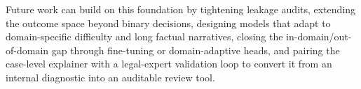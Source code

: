 Future work can build on this foundation by tightening leakage audits, extending the outcome space beyond binary decisions, designing models that adapt to domain-specific difficulty and long factual narratives, closing the in-domain/out-of-domain gap through fine-tuning or domain-adaptive heads, and pairing the case-level explainer with a legal-expert validation loop to convert it from an internal diagnostic into an auditable review tool.
